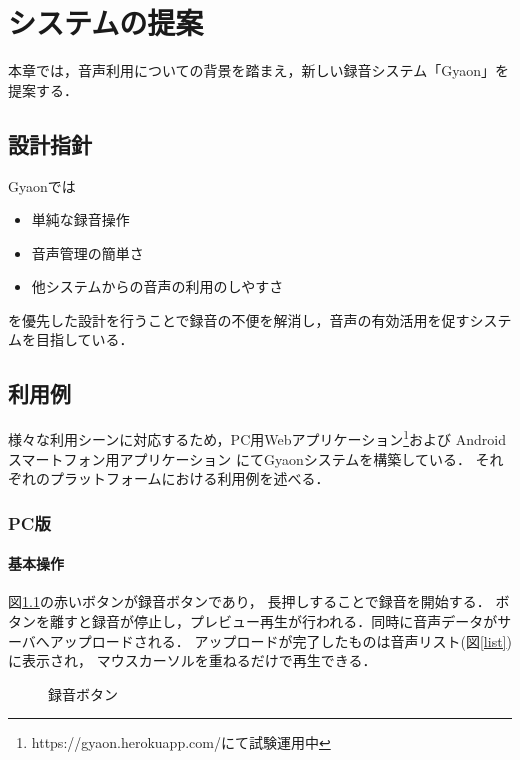\chapter{システムの提案}
\label{chap:proposal}

本章では，音声利用についての背景を踏まえ，新しい録音システム「Gyaon」を提案する．

\newpage

\section{設計指針}

Gyaonでは
\begin{itemize}
\item 単純な録音操作
\item 音声管理の簡単さ
\item 他システムからの音声の利用のしやすさ
\end{itemize}
を優先した設計を行うことで録音の不便を解消し，音声の有効活用を促すシステムを目指している．

\section{利用例}
様々な利用シーンに対応するため，PC用Webアプリケーション\footnote{\textsf{https://gyaon.herokuapp.com/にて試験運用中}}および
Androidスマートフォン用アプリケーション
にてGyaonシステムを構築している．
それぞれのプラットフォームにおける利用例を述べる．

\subsection{PC版}

\subsubsection{基本操作}
図\ref{button}の赤いボタンが録音ボタンであり，
長押しすることで録音を開始する．
ボタンを離すと録音が停止し，プレビュー再生が行われる．同時に音声データがサーバへアップロードされる．
アップロードが完了したものは音声リスト(図\ref{list})に表示され，
マウスカーソルを重ねるだけで再生できる．

\begin{figure}[H]
\centering
{}
\caption{録音ボタン}
\label{button}
\end{figure}

